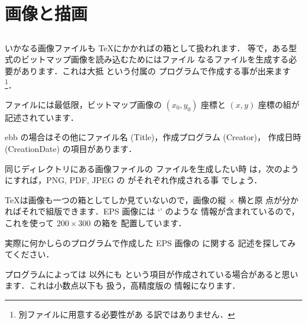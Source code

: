 ﻿%
\chapter{画像と描画}

\begin{abstract}
\begin{flushright}
画像でも\\
\TeX にかかれば\\
の箱
\end{flushright}
\end{abstract}

\section{\BB}

いかなる画像ファイルも \TeX にかかればの箱として扱われます．
\dvipdfmx 等で，ある型式のビットマップ画像を読み込むためには\BB ファイル
なるファイルを生成する必要があります．これは大抵  という付属の
プログラムで作成する事が出来ます\footnote{別ファイルに用意する必要性があ
る訳ではありません．}．

\BB ファイルには最低限，ビットマップ画像の $(x_0, y_0)$ 座標と $(x, y)$
座標の組が記述されています．

\begin{InText}
\end{InText}

ebb の場合はその他にファイル名 (Title)，作成プログラム (Creator)，
作成日時 (CreationDate) の項目があります．

同じディレクトリにある画像ファイルの \BB ファイルを生成したい時
は，次のようにすれば，PNG, PDF, JPEG の  がそれぞれ作成される事
でしょう．

\begin{InTerm}
\end{InTerm}

\TeX は画像も一つの箱としてしか見ていないので，画像の縦 $\times$ 横と原
点が分かればそれで組版できます．EPS 画像には `' のような
\BB  情報が含まれているので，これを使って $200 \times 300$ の箱を
配置しています．

\begin{Prob}
実際に何かしらのプログラムで作成した EPS 画像の \BB に関する
記述を探してみてください．

\begin{InText}
\end{InText}

プログラムによっては  以外にも 
という項目が作成されている場合があると思います．これは小数点以下も
扱う，高精度版の \BB 情報になります．
\end{Prob}

